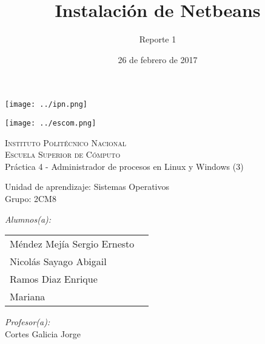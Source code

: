 \documentclass[12pt]{article}
\date{26 de febrero de 2017}
\title{Instalación de Netbeans}
\author{Reporte 1}
\begin{document}
		\begin{titlepage}
			\begin{center}
				
				
				\noindent
				\begin{minipage}{0.5\textwidth}
					\begin{flushleft} \large
						\texttt{[image: ../ipn.png]}
					\end{flushleft}
				\end{minipage}%
				\begin{minipage}{0.55\textwidth}
					\begin{flushright} \large
						\texttt{[image: ../escom.png]}
					\end{flushright}
				\end{minipage}
				
				\textsc{\LARGE Instituto Politécnico Nacional}\\[0.5cm]
				
				\textsc{\Large Escuela Superior de Cómputo}\\[1cm]
				
				
				{ \huge Práctica 4 - Administrador de procesos en Linux y Windows (3) \\[1cm] }
				
				{ \Large Unidad de aprendizaje: Sistemas Operativos} \\[1cm]
				
				{ \Large Grupo: 2CM8 } \\[1cm]
				
				\noindent
				\begin{minipage}{0.5\textwidth}
					\begin{flushleft} \large
						\emph{Alumnos(a):}\\
						
						\begin{tabular}{ll}
						 Méndez Mejía Sergio Ernesto \\
					     Nicolás Sayago Abigail\\
					     Ramos Diaz Enrique \\
					     Mariana \\
					     
					\end{tabular}
					\end{flushleft}
				\end{minipage}%
				\begin{minipage}{0.5\textwidth}
					\begin{flushright} \large
						\emph{Profesor(a):} \\
						Cortes Galicia Jorge  \\
					\end{flushright}
				\end{minipage}
				

\end{center}
\end{titlepage}
\end{document}
